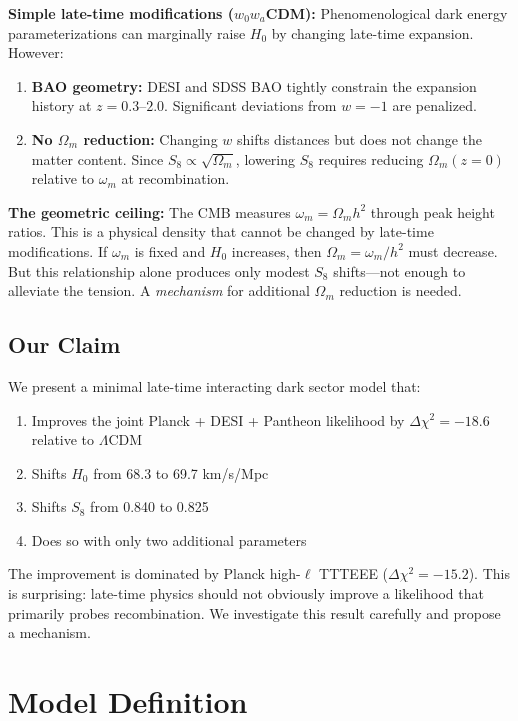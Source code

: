 \documentclass[twocolumn,showpacs,preprintnumbers,amsmath,amssymb,prd]{revtex4-2}
\begin{document}
\textbf{Simple late-time modifications ($w_0w_a$CDM):} Phenomenological dark energy parameterizations can marginally raise $H_0$ by changing late-time expansion. However:
\begin{enumerate}
    \item \textbf{BAO geometry:} DESI and SDSS BAO tightly constrain the expansion history at $z = 0.3$--$2.0$. Significant deviations from $w = -1$ are penalized.
    \item \textbf{No $\Omega_m$ reduction:} Changing $w$ shifts distances but does not change the matter content. Since $S_8 \propto \sqrt{\Omega_m}$, lowering $S_8$ requires reducing $\Omega_m(z=0)$ relative to $\omega_m$ at recombination.
\end{enumerate}

\textbf{The geometric ceiling:} The CMB measures $\omega_m = \Omega_m h^2$ through peak height ratios. This is a physical density that cannot be changed by late-time modifications. If $\omega_m$ is fixed and $H_0$ increases, then $\Omega_m = \omega_m/h^2$ must decrease. But this relationship alone produces only modest $S_8$ shifts---not enough to alleviate the tension. A \textit{mechanism} for additional $\Omega_m$ reduction is needed.

\subsection{Our Claim}

We present a minimal late-time interacting dark sector model that:
\begin{enumerate}
    \item Improves the joint Planck + DESI + Pantheon likelihood by $\Delta\chi^2 = -18.6$ relative to $\Lambda$CDM
    \item Shifts $H_0$ from 68.3 to 69.7 km/s/Mpc
    \item Shifts $S_8$ from 0.840 to 0.825
    \item Does so with only two additional parameters
\end{enumerate}

The improvement is dominated by Planck high-$\ell$ TTTEEE ($\Delta\chi^2 = -15.2$). This is surprising: late-time physics should not obviously improve a likelihood that primarily probes recombination. We investigate this result carefully and propose a mechanism.

\section{Model Definition}
\label{sec:model}
\end{document}

